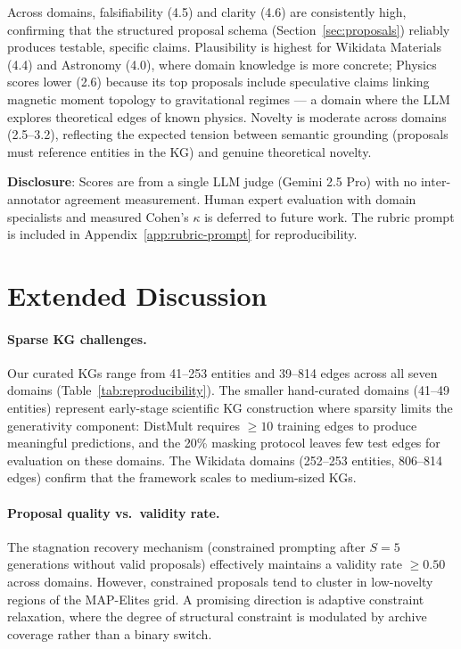 Across domains, falsifiability (4.5) and clarity (4.6) are consistently high,
confirming that the structured proposal schema (Section~\ref{sec:proposals})
reliably produces testable, specific claims.  Plausibility is highest for
Wikidata Materials (4.4) and Astronomy (4.0), where domain knowledge is more
concrete; Physics scores lower (2.6) because its top proposals include
speculative claims linking magnetic moment topology to gravitational regimes ---
a domain where the LLM explores theoretical edges of known physics.  Novelty
is moderate across domains (2.5--3.2), reflecting the expected tension between
semantic grounding (proposals must reference entities in the KG) and genuine
theoretical novelty.

\noindent\textbf{Disclosure}: Scores are from a single LLM judge (Gemini 2.5
Pro) with no inter-annotator agreement measurement.  Human expert evaluation
with domain specialists and measured Cohen's $\kappa$ is deferred to future
work.  The rubric prompt is included in Appendix~\ref{app:rubric-prompt} for
reproducibility.

\section{Extended Discussion}\label{app:extended-discussion}

\paragraph{Sparse KG challenges.}
Our curated KGs range from 41--253 entities and 39--814 edges across all seven
domains (Table~\ref{tab:reproducibility}).  The smaller hand-curated domains
(41--49 entities) represent early-stage scientific KG construction where
sparsity limits the generativity component: DistMult requires $\geq 10$
training edges to produce meaningful predictions, and the 20\% masking protocol
leaves few test edges for evaluation on these domains.  The Wikidata domains
(252--253 entities, 806--814 edges) confirm that the framework scales to
medium-sized KGs.

\paragraph{Proposal quality vs.\ validity rate.}
The stagnation recovery mechanism (constrained prompting after $S = 5$
generations without valid proposals) effectively maintains a validity rate
$\geq 0.50$ across domains.  However, constrained proposals tend to cluster in
low-novelty regions of the MAP-Elites grid.  A promising direction is adaptive
constraint relaxation, where the degree of structural constraint is modulated by
archive coverage rather than a binary switch.

